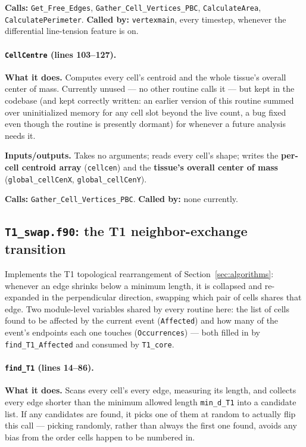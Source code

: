 \documentclass[11pt]{article}
\begin{document}
\textbf{Calls:} \texttt{Get\_Free\_Edges}, \texttt{Gather\_Cell\_Vertices\_PBC},
\texttt{CalculateArea}, \texttt{CalculatePerimeter}. \textbf{Called by:}
\texttt{vertexmain}, every timestep, whenever the differential line-tension feature is
on.

\paragraph{\texttt{CellCentre} (lines 103--127).}
\textbf{What it does.} Computes every cell's centroid and the whole tissue's overall
center of mass. Currently unused --- no other routine calls it --- but kept in the
codebase (and kept correctly written: an earlier version of this routine summed over
uninitialized memory for any cell slot beyond the live count, a bug fixed even though
the routine is presently dormant) for whenever a future analysis needs it.

\textbf{Inputs/outputs.} Takes no arguments; reads every cell's shape; writes the
\textbf{per-cell centroid array} (\texttt{cellcen}) and the \textbf{tissue's overall
center of mass} (\texttt{global\_cellCenX}, \texttt{global\_cellCenY}).

\textbf{Calls:} \texttt{Gather\_Cell\_Vertices\_PBC}. \textbf{Called by:} none currently.
\subsection{\texttt{T1\_swap.f90}: the T1 neighbor-exchange transition}
\label{sec:codet1}

Implements the T1 topological rearrangement of Section~\ref{sec:algorithms}: whenever an
edge shrinks below a minimum length, it is collapsed and re-expanded in the
perpendicular direction, swapping which pair of cells shares that edge. Two module-level
variables shared by every routine here: the list of cells found to be affected by the
current event (\texttt{Affected}) and how many of the event's endpoints each one
touches (\texttt{Occurrences}) --- both filled in by \texttt{find\_T1\_Affected} and
consumed by \texttt{T1\_core}.

\paragraph{\texttt{find\_T1} (lines 14--86).}
\textbf{What it does.} Scans every cell's every edge, measuring its length, and
collects every edge shorter than the minimum allowed length \texttt{min\_d\_T1} into a
candidate list. If any candidates are found, it picks one of them at random to actually
flip this call --- picking randomly, rather than always the first one found, avoids any
bias from the order cells happen to be numbered in.
\end{document}
